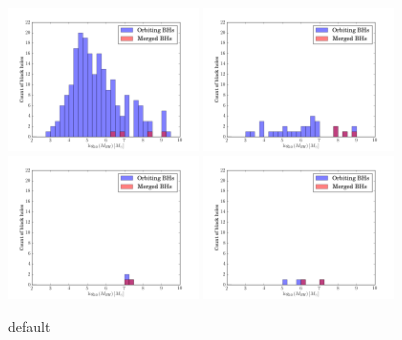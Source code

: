 \documentclass[english, apj]{emulateapj}
\begin{document}
\begin{figure}[htbp]
\begin{center}
\includegraphics[width=0.45\textwidth]{plots/orbiting_bh_mass_histogram_gal_1.png}
\includegraphics[width=0.45\textwidth]{plots/orbiting_bh_mass_histogram_gal_65.png}\\
\includegraphics[width=0.45\textwidth]{plots/orbiting_bh_mass_histogram_gal_187.png}
\includegraphics[width=0.45\textwidth]{plots/orbiting_bh_mass_histogram_gal_217.png}\\
\caption{default}
\label{default3}
\end{center}
\end{figure}
\end{document}
